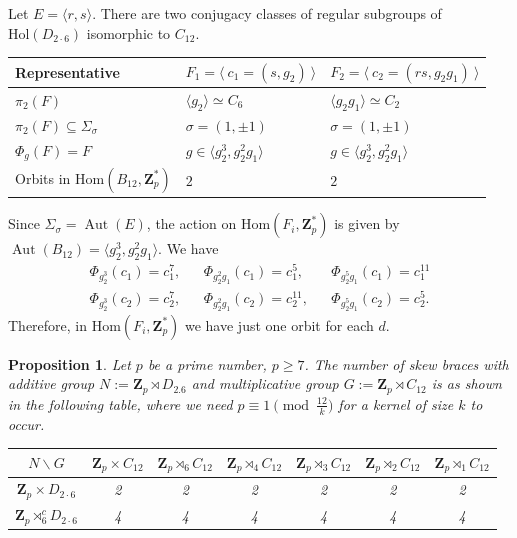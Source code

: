 \documentclass[12pt]{article}
\newtheorem{proposition}[theorem]{Proposition}
\theoremstyle{definition}
\newcommand{\Z}{\mathbf Z}
\newcommand{\Hol}{\mathrm{Hol}}
\newcommand{\Hom}{\mathrm{Hom}}
\newcommand{\Aut}{\operatorname{Aut}}
\begin{document}
	Let $E=\langle r,s\rangle$.
	There are two conjugacy classes of regular subgroups of $\Hol(D_{2\cdot 6})$ isomorphic to $C_{12}$.

\begin{center}
    \begin{tabular}{|l|l|l|}
    \hline
      Representative& $F_1=\langle\  c_1=(s, g_2)\ \rangle $ & $F_2=\langle\  c_2=(rs,g_2g_1 )\ \rangle$ \\
      \hline
      $\pi_2(F)$ & $\langle g_2\rangle \simeq C_6$ &$ \langle g_2g_1\rangle \simeq C_2$\\
      $\pi_2(F)\subseteq \Sigma_{\sigma}$ &{$\sigma=(1,\pm 1)$} &{$\sigma=(1,\pm 1)$}  \\
      $\Phi_g(F)=F$ &{$g\in\langle g_2^3,g_2^2g_1\rangle$}&{$g\in\langle g_2^3,g_2^2g_1\rangle$}\\
      Orbits in $\Hom(B_{12},\Z_p^*)$ & $2$ & $2$ \\
      \hline
    \end{tabular}
\end{center}    

Since $\Sigma_{\sigma}=\Aut(E)$, the action on $\Hom(F_i,\Z_p^*)$ is given by $\Aut(B_{12})=\langle g_2^3,g_2^2g_1\rangle$.
We have
	$$\begin{array}{lclcl}
    \Phi_{g_2^3}(c_1)=c_1^7, && \Phi_{g_2^2g_1}(c_1)=c_1^5,&&\Phi_{g_2^5g_1}(c_1)=c_1^{11}\\
	\Phi_{g_2^3}(c_2)=c_2^7,&& \Phi_{g_2^2g_1}(c_2)=c_2^{11},&&
	\Phi_{g_2^5g_1}(c_2)=c_2^{5}.
    \end{array}$$
	Therefore, in $\Hom(F_i,\Z_p^*)$ we have just one orbit for each $d$.
	
	\begin{proposition}
		Let $p$ be a prime number, $p\geq 7$.
		The number of skew braces with additive group $N:=\Z_p \rtimes D_{2.6}$ and multiplicative group $G:=\Z_p\rtimes C_{12}$ is as shown in the following table, where we need
		$p\equiv 1 \pmod{\frac {12}k}$ for a kernel of size $k$ to occur.
		
		
		\begin{center}
			\begin{tabular}{|c||c|c|c|c|c|c|}
				\hline
				$N \backslash G$ & $\Z_p\times C_{12}$ & $\Z_p\rtimes_{6} C_{12}$ & $\Z_p\rtimes_{4} C_{12}$
				& $\Z_p\rtimes_{3} C_{12}$ & $\Z_p\rtimes_{2} C_{12}$& $\Z_p\rtimes_{1} C_{12}$\\
				\hline
				\hline
				$\Z_p \times D_{2\cdot 6}$ &2 & 2 & 2 &2 &2 & 2 \\
				\hline
				$\Z_p \rtimes_6^c D_{2\cdot 6}$ &4 & 4 & 4& 4&4  & 4 \\
				\hline
				
			\end{tabular}
		\end{center}
	\end{proposition}
	
\end{document}
